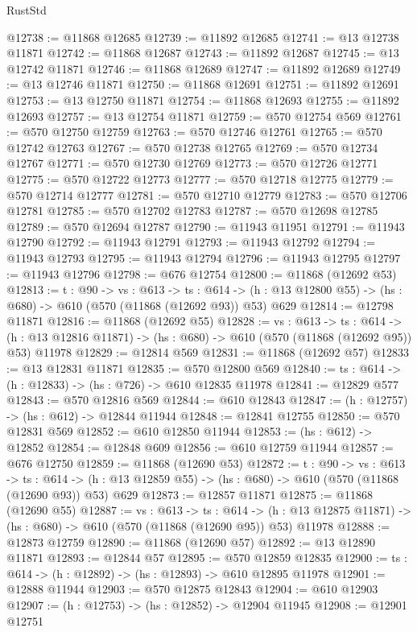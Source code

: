 \begin{lexlean}{RustStd}
\begin{coremodule}
@12738 := @11868 @12685
@12739 := @11892 @12685
@12741 := @13 @12738 @11871
@12742 := @11868 @12687
@12743 := @11892 @12687
@12745 := @13 @12742 @11871
@12746 := @11868 @12689
@12747 := @11892 @12689
@12749 := @13 @12746 @11871
@12750 := @11868 @12691
@12751 := @11892 @12691
@12753 := @13 @12750 @11871
@12754 := @11868 @12693
@12755 := @11892 @12693
@12757 := @13 @12754 @11871
@12759 := @570 @12754 @569
@12761 := @570 @12750 @12759
@12763 := @570 @12746 @12761
@12765 := @570 @12742 @12763
@12767 := @570 @12738 @12765
@12769 := @570 @12734 @12767
@12771 := @570 @12730 @12769
@12773 := @570 @12726 @12771
@12775 := @570 @12722 @12773
@12777 := @570 @12718 @12775
@12779 := @570 @12714 @12777
@12781 := @570 @12710 @12779
@12783 := @570 @12706 @12781
@12785 := @570 @12702 @12783
@12787 := @570 @12698 @12785
@12789 := @570 @12694 @12787
@12790 := @11943 @11951
@12791 := @11943 @12790
@12792 := @11943 @12791
@12793 := @11943 @12792
@12794 := @11943 @12793
@12795 := @11943 @12794
@12796 := @11943 @12795
@12797 := @11943 @12796
@12798 := @676 @12754
@12800 := @11868 (@12692 @53)
@12813 := {t : @90} ->
  {vs : @613} ->
  {ts : @614} -> (h : @13 @12800 @55) -> (hs : @680) -> @610 (@570 (@11868 (@12692 @93)) @53) @629
@12814 := @12798 @11871
@12816 := @11868 (@12692 @55)
@12828 := {vs : @613} ->
  {ts : @614} ->
  (h : @13 @12816 @11871) -> (hs : @680) -> @610 (@570 (@11868 (@12692 @95)) @53) @11978
@12829 := @12814 @569
@12831 := @11868 (@12692 @57)
@12833 := @13 @12831 @11871
@12835 := @570 @12800 @569
@12840 := {ts : @614} -> (h : @12833) -> (hs : @726) -> @610 @12835 @11978
@12841 := @12829 @577
@12843 := @570 @12816 @569
@12844 := @610 @12843
@12847 := (h : @12757) -> (hs : @612) -> @12844 @11944
@12848 := @12841 @12755
@12850 := @570 @12831 @569
@12852 := @610 @12850 @11944
@12853 := (hs : @612) -> @12852
@12854 := @12848 @609
@12856 := @610 @12759 @11944
@12857 := @676 @12750
@12859 := @11868 (@12690 @53)
@12872 := {t : @90} ->
  {vs : @613} ->
  {ts : @614} -> (h : @13 @12859 @55) -> (hs : @680) -> @610 (@570 (@11868 (@12690 @93)) @53) @629
@12873 := @12857 @11871
@12875 := @11868 (@12690 @55)
@12887 := {vs : @613} ->
  {ts : @614} ->
  (h : @13 @12875 @11871) -> (hs : @680) -> @610 (@570 (@11868 (@12690 @95)) @53) @11978
@12888 := @12873 @12759
@12890 := @11868 (@12690 @57)
@12892 := @13 @12890 @11871
@12893 := @12844 @57
@12895 := @570 @12859 @12835
@12900 := {ts : @614} -> (h : @12892) -> (hs : @12893) -> @610 @12895 @11978
@12901 := @12888 @11944
@12903 := @570 @12875 @12843
@12904 := @610 @12903
@12907 := (h : @12753) -> (hs : @12852) -> @12904 @11945
@12908 := @12901 @12751

\end{coremodule}
\end{lexlean}
